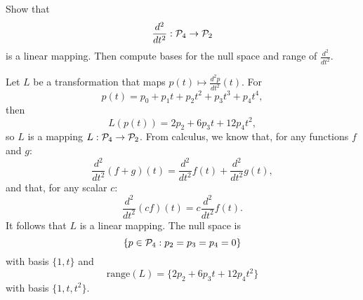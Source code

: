 \documentclass{ximera}
\begin{document}
\begin{exercise}  \label{A8.1.1}
Show that
\[
\frac{d^2}{dt^2}:{\cal P}_4\to{\cal P}_2
\]
is a linear mapping.  Then compute bases for the null space  
and range of $\frac{d^2}{dt^2}$.

\begin{solution}

\soln Let $L$ be a transformation that maps $p(t) \mapsto
\frac{d^2p}{dt^2}(t)$.  For 
\[
p(t) =  p_0 + p_1t + p_2t^2 + p_3t^3+p_4t^4,
\]
then
\[
L(p(t)) = 2p_2 + 6p_3t + 12p_4t^2,
\]
so $L$ is a mapping $L:{\cal P}_4 \rightarrow {\cal P}_2$.  From calculus, we
know that, for any functions $f$ and $g$:
\[ 
\frac{d^2}{dt^2}(f + g)(t) = \frac{d^2}{dt^2}f(t) + \frac{d^2}{dt^2}g(t), 
\]
and that, for any scalar $c$:
\[ 
\frac{d^2}{dt^2}(cf)(t) = c\frac{d^2}{dt^2}f(t). 
\]
It follows that $L$ is a linear mapping.  The null space is
\[
\{p\in  {\cal P}_4: p_2=p_3=p_4=0\} 
\]
with basis $\{1,t\}$ and 
\[
\text{range}(L) =\{2p_2 + 6p_3 t +12 p_4 t^2\} 
\]
with basis $\{1,t,t^2\}$.
\end{solution}
\end{exercise}
\end{document}
